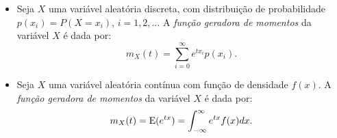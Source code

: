 \begin{frame}
	\begin{defi}
		\begin{itemize}
			\item Seja $X$ uma variável aleatória discreta, com distribuição de probabilidade $p(x_i) = P(X = x_i)$, $i = 1,2,\ldots$ A {\it função geradora de momentos} da variável $X$ é dada por:
			$$m_X(t) = \sum_{i=0}^\infty  e^{tx_i}p(x_i).$$
			
			\item Seja $X$ uma variável aleatória contínua com função de densidade $f(x)$. A {\it função geradora de momentos} da variável  $X$ é dada por:  
			$$m_X(t) = {\rm E}(e^{tx}) = \int_{-\infty}^{\infty} e^{tx} f(x)dx.$$
		\end{itemize}
	\end{defi}
	
	
	
	
	
	
	
	
	
	
	
	
	
	
	

\end{frame}
